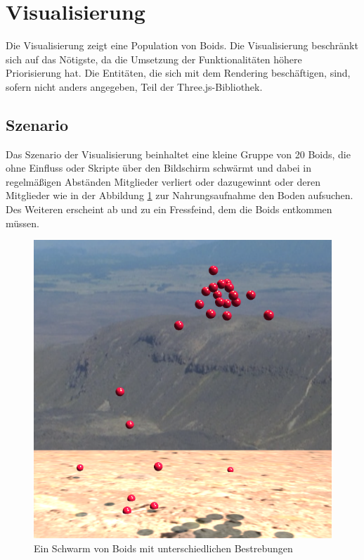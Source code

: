 \documentclass[draft=false
              ,paper=a4
              ,twoside=false
              ,fontsize=11pt
              ,headsepline
              ,BCOR10mm
              ,DIV11
              ,bibtotoc
              ,liststotoc
              ]{scrbook}
\begin{document}
\section{Visualisierung}\label{visual}
Die Visualisierung zeigt eine Population von Boids. Die Visualisierung beschränkt sich auf das Nötigste, da die Umsetzung der Funktionalitäten höhere Priorisierung hat.
Die Entitäten, die sich mit dem Rendering beschäftigen, sind, sofern nicht anders angegeben, Teil der Three.js-Bibliothek.

\subsection{Szenario}
Das Szenario der Visualisierung beinhaltet eine kleine Gruppe von 20 Boids, die ohne Einfluss oder Skripte über den Bildschirm schwärmt und dabei in regelmäßigen Abständen Mitglieder verliert oder dazugewinnt oder deren Mitglieder wie in der Abbildung \ref{swarming} zur Nahrungsaufnahme den Boden aufsuchen. Des Weiteren erscheint ab und zu ein Fressfeind, dem die Boids entkommen müssen.

\begin{figure}[!h]
\centering
\includegraphics[scale=0.4]{project/upheaval.png}
\caption{Ein Schwarm von Boids mit unterschiedlichen Bestrebungen}
\label{swarming}
\end{figure}
\end{document}
